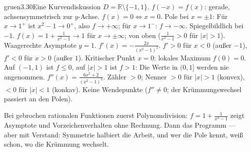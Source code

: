 \begin{loesungkarte}{gruen}{3.30}{Eine Kurvendiskussion}
$D = \mathbb R\setminus\{-1, 1\}$. $f(-x) = f(x)$: gerade, achsensymmetrisch zur $y$-Achse.
$f(x) = 0\iff x = 0$. Pole bei $x = \pm1$: Für $x\to1^{+}$ ist $x^{2} - 1\to0^{+}$, also $f\to+\infty$; für $x\to1^{-}$: $f\to-\infty$. Spiegelbildlich bei $-1$.
$f(x) = 1 + \frac1{x^{2} - 1}\to1$ für $x\to\pm\infty$; von oben ($\frac1{x^{2} - 1} > 0$ für $|x| > 1$). Waagerechte Asymptote $y = 1$.
$f'(x) = -\frac{2x}{(x^{2} - 1)^{2}}$. $f' > 0$ für $x < 0$ (außer $-1$), $f' < 0$ für $x > 0$ (außer $1$). Kritischer Punkt $x = 0$: lokales Maximum $f(0) = 0$. Auf $(-1, 1)$ ist $f\le0$, auf $|x| > 1$ ist $f > 1$: Die Werte in $(0, 1]$ werden nie angenommen.
$f''(x) = \frac{6x^{2} + 2}{(x^{2} - 1)^{3}}$. Zähler $> 0$; Nenner $> 0$ für $|x| > 1$ (konvex), $< 0$ für $|x| < 1$ (konkav). Keine Wendepunkte ($f''\neq0$; der Krümmungswechsel passiert an den Polen).
\begin{center}
\end{center}
\begin{mitnehmen}\kastentext
Bei gebrochen rationalen Funktionen zuerst Polynomdivision: $f = 1 + \frac1{x^{2} - 1}$ zeigt Asymptote und Vorzeichenverhalten ohne Rechnung. Dann das Programm --- aber mit Verstand: Symmetrie halbiert die Arbeit, und wer die Pole kennt, weiß schon, wo die Krümmung wechselt.
\end{mitnehmen}
\end{loesungkarte}

